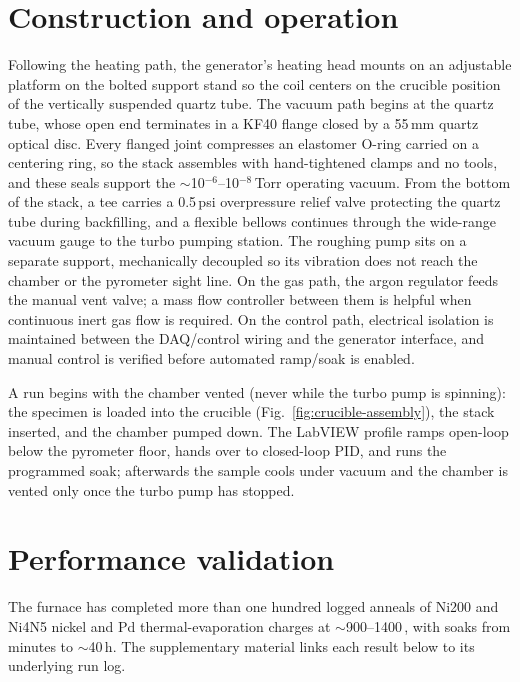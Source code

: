 \documentclass[%
 aip,
 rsi,%
 amsmath,amssymb,
 reprint,%
]{revtex4-2}
\begin{document}
\section{Construction and operation}

Following the heating path, the generator's heating head mounts on an
adjustable platform on the bolted support stand so the coil centers on the
crucible position of the vertically suspended quartz tube. The vacuum path
begins at the quartz tube, whose open end terminates in a KF40 flange closed
by a 55\,mm quartz optical disc. Every flanged joint compresses an elastomer
O-ring carried on a centering ring, so the stack assembles with hand-tightened
clamps and no tools, and these seals support the
$\sim$10$^{-6}$--10$^{-8}$\,Torr operating vacuum. From the bottom of the
stack, a tee carries a 0.5\,psi overpressure relief valve protecting the
quartz tube during backfilling, and a flexible bellows continues through the
wide-range vacuum gauge to the turbo pumping station. The roughing pump sits
on a separate support, mechanically decoupled so its vibration does not reach
the chamber or the pyrometer sight line. On the gas path, the argon regulator
feeds the manual vent valve; a mass flow controller between them is helpful
when continuous inert gas flow is required. On the control path, electrical
isolation is maintained between the
DAQ/control wiring and the generator interface, and manual control is verified
before automated ramp/soak is enabled.

A run begins with the chamber vented (never while the
turbo pump is spinning): the specimen is loaded into the crucible
(Fig.~\ref{fig:crucible-assembly}), the stack inserted, and the chamber pumped
down. The LabVIEW profile ramps open-loop below the pyrometer floor, hands
over to closed-loop PID, and runs the programmed soak; afterwards the sample
cools under vacuum and the chamber is vented only once the turbo pump has
stopped.

\section{Performance validation}

The furnace has completed more than one hundred logged anneals of Ni200 and
Ni4N5 nickel and Pd thermal-evaporation charges at
$\sim$900--1400\,\celsius, with soaks from minutes to $\sim$40\,h. The
supplementary material links each result below to its underlying run log.
\end{document}
